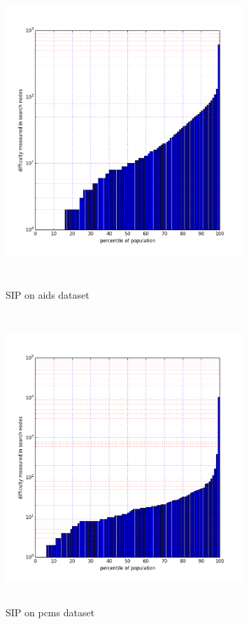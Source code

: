 \documentclass{l4proj}
\begin{document}
\begin{figure}[h]
\centering
\begin{minipage}[t]{.5\textwidth}
  \centering
  \includegraphics[height=11cm,width=9cm]{images/plots/aidsPercentileLog.png}
  \caption{SIP on aids dataset}
  \label{aidsNodes}
\end{minipage}%
\begin{minipage}[t]{.5\textwidth}
  \centering
  \includegraphics[height=11cm,width=9cm]{images/plots/pcmsPercentileLog.png}
  \caption{SIP on pcms dataset}
  \label{pcmsNodes}
\end{minipage}
\end{figure}
\end{document}
